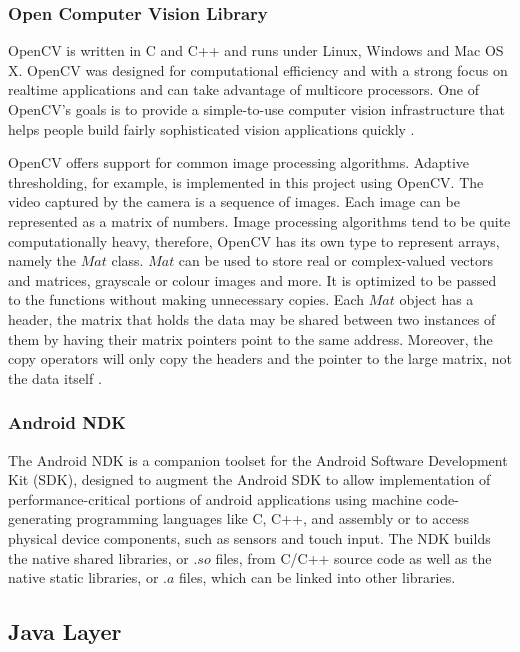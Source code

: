 \subsubsection{Open Computer Vision Library}
OpenCV is written in C and C++ and runs under Linux, Windows and Mac OS X. OpenCV was designed for computational efficiency and with a strong focus on realtime applications and can take advantage of multicore processors. One of OpenCV’s goals is to provide a simple-to-use computer vision infrastructure that helps people build fairly sophisticated vision applications quickly \parencite{openCv}.

OpenCV offers support for common image processing algorithms. Adaptive thresholding, for example, is implemented in this project using OpenCV. The video captured by the camera is a sequence of images. Each image can be represented as a matrix of numbers. Image processing algorithms tend to be quite computationally heavy, therefore, OpenCV has its own type to represent arrays, namely the $Mat$ class. $Mat$ can be used to store real or complex-valued vectors and matrices, grayscale or colour images and more. It is optimized to be passed to the functions without making unnecessary copies. Each $Mat$ object has a header, the matrix that holds the data may be shared between two instances of them by having their matrix pointers point to the same address. Moreover, the copy operators will only copy the headers and the pointer to the large matrix, not the data itself \parencite{openCv1}.


\subsubsection{Android NDK}


The Android NDK is a companion toolset for the Android Software Development Kit (SDK), designed to augment the Android SDK to allow implementation of performance-critical portions of android applications using machine code-generating programming languages like C, C++, and assembly \parencite{ndk} or to access physical device components, such as sensors and touch input. 
The NDK builds the native shared libraries, or $.so$ files, from C/C++ source code as well as the native static libraries, or $.a$ files, which can be linked into other libraries.


\subsection{Java Layer}

